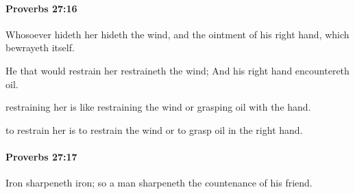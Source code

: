 		\paragraph{Proverbs 27:16} %
			\label{PROVERBS-27-16}

			Whosoever hideth her hideth the wind, and the ointment of his right hand, which bewrayeth itself.

			\begin{versebox}
					\item[BHS] 
					\item[ASV] He that would restrain her restraineth the wind; And his right hand encountereth oil.
					\item[NIV] restraining her is like restraining the wind or grasping oil with the hand.
					\item[NRSV] to restrain her is to restrain the wind or to grasp oil in the right hand.
			\end{versebox}

		\paragraph{Proverbs 27:17} %
			\label{PROVERBS-27-17}

			Iron sharpeneth iron; so a man sharpeneth the countenance of his friend.

